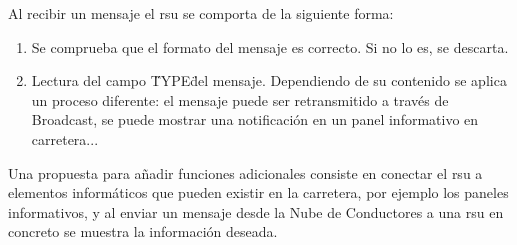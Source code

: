 Al recibir un mensaje el \gls{rsu} se comporta de la siguiente forma:
\begin{enumerate}
	\item Se comprueba que el formato del mensaje es correcto. Si no lo es, se descarta.
	\item Lectura del campo \"TYPE\" del mensaje. Dependiendo de su contenido se aplica un proceso diferente: el mensaje puede ser retransmitido a través de Broadcast, se puede mostrar una notificación en un panel informativo en carretera...
\end{enumerate}
		
Una propuesta para añadir funciones adicionales consiste en conectar el \gls{rsu} a elementos informáticos que pueden existir en la carretera, por ejemplo los paneles informativos, y al enviar un mensaje desde la Nube de Conductores a una \gls{rsu} en concreto se muestra la información deseada.